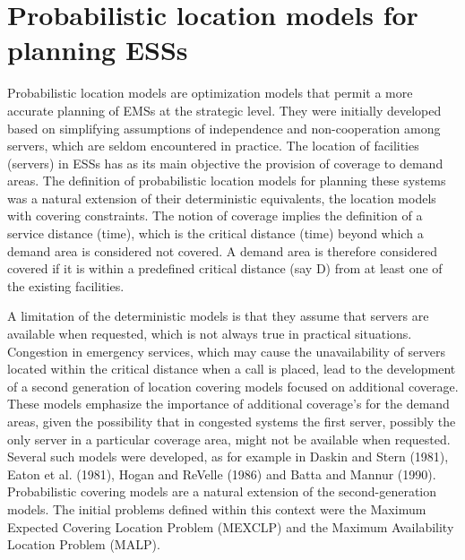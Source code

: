 \section{Probabilistic location models for planning ESSs}
Probabilistic location models
are optimization models
that permit a more accurate planning
of EMSs at the strategic level.
They were initially developed
based on simplifying assumptions of independence
and non-cooperation among servers,
which are seldom encountered in practice.
The location of facilities (servers) in ESSs
has as its main objective
the provision of coverage to demand areas.
The definition of
probabilistic location models for planning these systems
was a natural extension
of their deterministic equivalents,
the location models with covering constraints.
The notion of coverage
implies
the definition of a service distance (time),
which is the critical distance (time)
beyond which a demand area is considered not covered.
A demand area is
therefore
considered covered
if
it is within a predefined critical distance (say D)
from at least one of the existing facilities.

A limitation of the deterministic models
is that
they assume
that servers are available when requested,
which is not always true in practical situations.
Congestion in emergency services,
which may cause
the unavailability
of servers located
within the critical distance
when a call is placed,
lead to
the development of
a second generation of location covering models
focused on additional coverage.
These models
emphasize the importance of additional coverage's
for the demand areas,
given the possibility that
in congested systems
the first server,
possibly
the only server in a particular coverage area,
might not be available when requested.
Several such models were developed,
as for example in Daskin and Stern (1981),
Eaton et al. (1981),
Hogan and ReVelle (1986)
and Batta and Mannur (1990).
Probabilistic covering models
are a natural extension
of the second-generation models.
The initial problems
defined within this context
were
the Maximum Expected Covering Location Problem (MEXCLP)
and
the Maximum Availability Location Problem (MALP).
